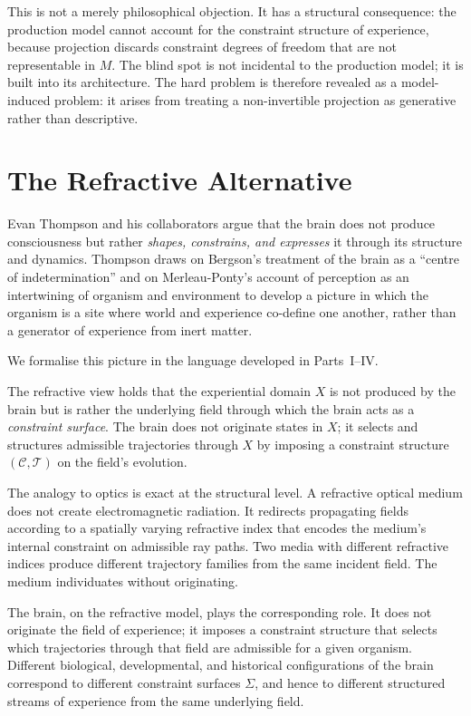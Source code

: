 \documentclass[11pt,openany]{book}
\begin{document}
This is not a merely philosophical objection.  It has a
structural consequence: the production model cannot account
for the constraint structure of experience, because
projection discards constraint degrees of freedom that are
not representable in $M$.  The blind spot is not incidental
to the production model; it is built into its architecture.
The hard problem is therefore revealed as a model-induced
problem: it arises from treating a non-invertible projection
as generative rather than descriptive.

\section{The Refractive Alternative}
\label{sec:refractive-alternative}

Evan Thompson and his collaborators \citep{thompson2023blindspot,
varela1991embodied} argue that the brain does not produce
consciousness but rather \emph{shapes, constrains, and
expresses} it through its structure and dynamics.
Thompson draws on Bergson's treatment of the brain as a
``centre of indetermination'' \citep{bergson1889time} and
on Merleau-Ponty's account of perception as an intertwining
of organism and environment \citep{merleauponty1945phenomenology}
to develop a picture in which the organism is a site where
world and experience co-define one another, rather than a
generator of experience from inert matter.

We formalise this picture in the language developed in
Parts~I--IV.

The refractive view holds that the experiential domain $X$
is not produced by the brain but is rather the underlying
field through which the brain acts as a \emph{constraint
surface}.  The brain does not originate states in $X$; it
selects and structures admissible trajectories through $X$
by imposing a constraint structure $(\mathcal{C},
\mathcal{T})$ on the field's evolution.

The analogy to optics is exact at the structural level.
A refractive optical medium does not create electromagnetic
radiation.  It redirects propagating fields according to a
spatially varying refractive index that encodes the medium's
internal constraint on admissible ray paths.  Two media with
different refractive indices produce different trajectory
families from the same incident field.  The medium
individuates without originating.

The brain, on the refractive model, plays the corresponding
role.  It does not originate the field of experience; it
imposes a constraint structure that selects which
trajectories through that field are admissible for a given
organism.  Different biological, developmental, and
historical configurations of the brain correspond to
different constraint surfaces $\Sigma$, and hence to
different structured streams of experience from the same
underlying field.
\end{document}
